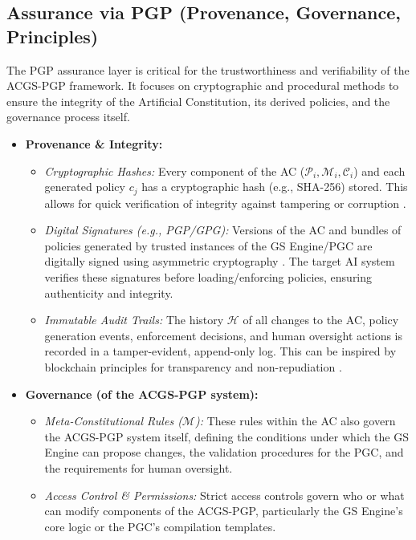 \documentclass[sigconf,review,screen]{acmart}
\begin{document}
\subsection{Assurance via PGP (Provenance, Governance, Principles)}
The PGP assurance layer is critical for the trustworthiness and verifiability of the ACGS-PGP framework. It focuses on cryptographic and procedural methods to ensure the integrity of the Artificial Constitution, its derived policies, and the governance process itself.
\begin{itemize}
    \item \textbf{Provenance \& Integrity:}
        \begin{itemize}
            \item \textit{Cryptographic Hashes:} Every component of the AC ($\mathcal{P}_i, \mathcal{M}_i, \mathcal{C}_i$) and each generated policy $c_j$ has a cryptographic hash (e.g., SHA-256) stored. This allows for quick verification of integrity against tampering or corruption \cite{katz2020introduction}.
            \item \textit{Digital Signatures (e.g., PGP/GPG):} Versions of the AC and bundles of policies generated by trusted instances of the GS Engine/PGC are digitally signed using asymmetric cryptography \cite{diffie1976new}. The target AI system verifies these signatures before loading/enforcing policies, ensuring authenticity and integrity.
            \item \textit{Immutable Audit Trails:} The history $\mathcal{H}$ of all changes to the AC, policy generation events, enforcement decisions, and human oversight actions is recorded in a tamper-evident, append-only log. This can be inspired by blockchain principles for transparency and non-repudiation \cite{nakamoto2008bitcoin,haber1991digital}.
        \end{itemize}
    \item \textbf{Governance (of the ACGS-PGP system):}
        \begin{itemize}
            \item \textit{Meta-Constitutional Rules ($\mathcal{M}$):} These rules within the AC also govern the ACGS-PGP system itself, defining the conditions under which the GS Engine can propose changes, the validation procedures for the PGC, and the requirements for human oversight.
            \item \textit{Access Control \& Permissions:} Strict access controls govern who or what can modify components of the ACGS-PGP, particularly the GS Engine's core logic or the PGC's compilation templates.

\end{itemize}
\end{itemize}
\end{document}
